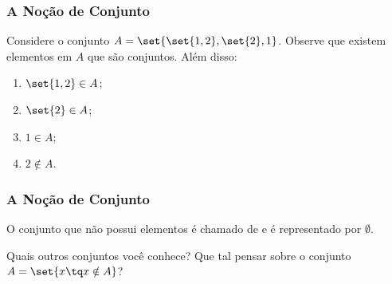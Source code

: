 \begin{frame}
    \frametitle{A Noção de Conjunto}
    
    \begin{exemplo}
        Considere o conjunto $A = \set{\set{1, 2}, \set{2}, 1 }$. Observe que existem elementos em $A$ que são conjuntos. Além disso:
        \begin{enumerate}
            \item $\set{1, 2} \in A$;
            \item $\set{2} \in A$;
            \item $1 \in A$;
            \item $2 \notin A$.
        \end{enumerate}
    \end{exemplo}
\end{frame}


\begin{frame}
    \frametitle{A Noção de Conjunto}

    \begin{definicao}
        O conjunto que não possui elementos é chamado de  e é representado por $\emptyset$.
    \end{definicao}

    \begin{exemplo}
        Quais outros conjuntos você conhece? Que tal pensar sobre o conjunto $ A = \set{ x \tq x \notin A} $?
    \end{exemplo}
\end{frame}
